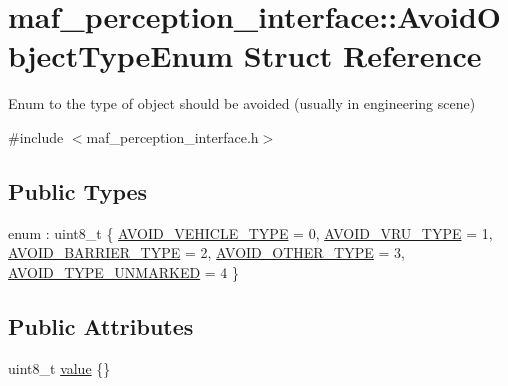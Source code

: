 \hypertarget{structmaf__perception__interface_1_1AvoidObjectTypeEnum}{}\section{maf\+\_\+perception\+\_\+interface\+:\+:Avoid\+Object\+Type\+Enum Struct Reference}
\label{structmaf__perception__interface_1_1AvoidObjectTypeEnum}


Enum to the type of object should be avoided (usually in engineering scene)  




{\ttfamily \#include $<$maf\+\_\+perception\+\_\+interface.\+h$>$}

\subsection*{Public Types}
\begin{DoxyCompactItemize}
\item 
enum \+: uint8\+\_\+t \{ \newline
\hyperlink{structmaf__perception__interface_1_1AvoidObjectTypeEnum_a35554cf9bb22e706e4bd564c872ae2aea624002a12db3fb12c64bb595c1f490fd}{A\+V\+O\+I\+D\+\_\+\+V\+E\+H\+I\+C\+L\+E\+\_\+\+T\+Y\+PE} = 0, 
\hyperlink{structmaf__perception__interface_1_1AvoidObjectTypeEnum_a35554cf9bb22e706e4bd564c872ae2aeafec9b2dede7d7aa58bc1b26e670c1476}{A\+V\+O\+I\+D\+\_\+\+V\+R\+U\+\_\+\+T\+Y\+PE} = 1, 
\hyperlink{structmaf__perception__interface_1_1AvoidObjectTypeEnum_a35554cf9bb22e706e4bd564c872ae2aea7fd5598dd8123caf97512c4d4ef2aa88}{A\+V\+O\+I\+D\+\_\+\+B\+A\+R\+R\+I\+E\+R\+\_\+\+T\+Y\+PE} = 2, 
\hyperlink{structmaf__perception__interface_1_1AvoidObjectTypeEnum_a35554cf9bb22e706e4bd564c872ae2aea02b3c93036eada0eee648ee6426d84bf}{A\+V\+O\+I\+D\+\_\+\+O\+T\+H\+E\+R\+\_\+\+T\+Y\+PE} = 3, 
\newline
\hyperlink{structmaf__perception__interface_1_1AvoidObjectTypeEnum_a35554cf9bb22e706e4bd564c872ae2aead5bc4a421b15d9b1cac5481f2fd408aa}{A\+V\+O\+I\+D\+\_\+\+T\+Y\+P\+E\+\_\+\+U\+N\+M\+A\+R\+K\+ED} = 4
 \}
\end{DoxyCompactItemize}
\subsection*{Public Attributes}
\begin{DoxyCompactItemize}
\item 
uint8\+\_\+t \hyperlink{structmaf__perception__interface_1_1AvoidObjectTypeEnum_a92ef4d56cb1d15027e17bdc1ae580daa}{value} \{\}
\end{DoxyCompactItemize}


